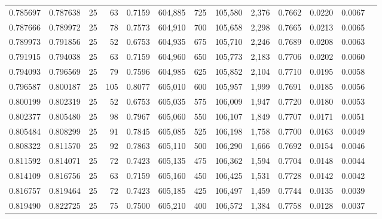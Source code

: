 \begin{tabular}{rrrrrrrrrrrrr}
0.785697 & 0.787638 &    25 &  63 &                                     0.7159 & 604,885 &     725 & 105,580 &   2,376 & 0.7662 & 0.0220 & 0.0067 \\
0.787666 & 0.789972 &    25 &  78 &                                     0.7573 & 604,910 &     700 & 105,658 &   2,298 & 0.7665 & 0.0213 & 0.0065 \\
0.789973 & 0.791856 &    25 &  52 &                                     0.6753 & 604,935 &     675 & 105,710 &   2,246 & 0.7689 & 0.0208 & 0.0063 \\
0.791915 & 0.794038 &    25 &  63 &                                     0.7159 & 604,960 &     650 & 105,773 &   2,183 & 0.7706 & 0.0202 & 0.0060 \\
0.794093 & 0.796569 &    25 &  79 &                                     0.7596 & 604,985 &     625 & 105,852 &   2,104 & 0.7710 & 0.0195 & 0.0058 \\
0.796587 & 0.800187 &    25 & 105 &                                     0.8077 & 605,010 &     600 & 105,957 &   1,999 & 0.7691 & 0.0185 & 0.0056 \\
0.800199 & 0.802319 &    25 &  52 &                                     0.6753 & 605,035 &     575 & 106,009 &   1,947 & 0.7720 & 0.0180 & 0.0053 \\
0.802377 & 0.805480 &    25 &  98 &                                     0.7967 & 605,060 &     550 & 106,107 &   1,849 & 0.7707 & 0.0171 & 0.0051 \\
0.805484 & 0.808299 &    25 &  91 &                                     0.7845 & 605,085 &     525 & 106,198 &   1,758 & 0.7700 & 0.0163 & 0.0049 \\
0.808322 & 0.811570 &    25 &  92 &                                     0.7863 & 605,110 &     500 & 106,290 &   1,666 & 0.7692 & 0.0154 & 0.0046 \\
0.811592 & 0.814071 &    25 &  72 &                                     0.7423 & 605,135 &     475 & 106,362 &   1,594 & 0.7704 & 0.0148 & 0.0044 \\
0.814109 & 0.816756 &    25 &  63 &                                     0.7159 & 605,160 &     450 & 106,425 &   1,531 & 0.7728 & 0.0142 & 0.0042 \\
0.816757 & 0.819464 &    25 &  72 &                                     0.7423 & 605,185 &     425 & 106,497 &   1,459 & 0.7744 & 0.0135 & 0.0039 \\
0.819490 & 0.822725 &    25 &  75 &                                     0.7500 & 605,210 &     400 & 106,572 &   1,384 & 0.7758 & 0.0128 & 0.0037 \\

\end{tabular}
